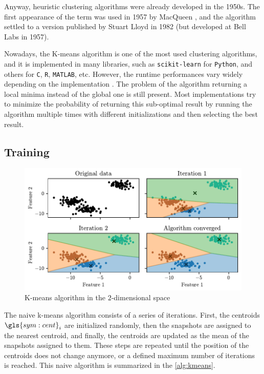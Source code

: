 Anyway, heuristic clustering algorithms were already developed in the 1950s. 
The first appearance of the term  was used in 1957 by MacQueen \cite{macqueen1967some}, and the algorithm settled to a  version  published by Stuart Lloyd in 1982 \cite{Lloyd1982} (but developed at Bell Labs in 1957).

Nowadays, the K-means algorithm is one of the most used clustering algorithms, and it is implemented in many libraries, such as \texttt{scikit-learn} for \texttt{Python}, and others for \texttt{C}, \texttt{R}, \texttt{MATLAB}, etc. However, the runtime performances vary widely depending on the implementation \cite{Kmeans-performances-Kriegel2017}. The problem of the algorithm returning a local minima instead of the global one is still present. Most implementations try to minimize the probability of returning this sub-optimal result by running the algorithm multiple times with different initializations and then selecting the best result.

\subsection{Training}

\begin{figure}[htbp]
  \centering
  \includegraphics[width=\textwidth]{images/Kmeans_vornoi.pdf}
  \caption{K-means algorithm in the $2$-dimensional space}
  \label{fig:kmeans_vornoi}
\end{figure}

 The naive k-means algorithm consists of a series of iterations. First, the centroids $\gls{sym:cent}_i$ are initialized randomly, then the snapshots are assigned to the nearest centroid, and finally, the centroids are updated as the mean of the snapshots assigned to them. These steps are repeated until the position of the centroids does not change anymore, or a defined maximum number of iterations is reached. This naive algorithm is summarized in the \autoref{alg:kmeans}.

